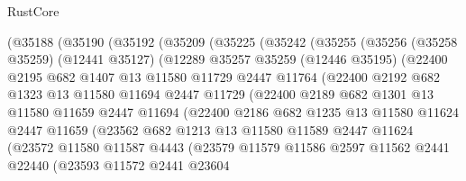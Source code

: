 \begin{lexlean}{RustCore}
\begin{coremodule}
      (@35188
        (@35190
          (@35192
            (@35209
              (@35225
                (@35242
                  (@35255
                    (@35256
                      (@35258 @35259)
                      (@12441 @35127)
                      (@12289
                        @35257
                        @35259
                        (@12446 @35195)
                        (@22400
                          @2195
                          @682
                          @1407
                          @13
                          @11580
                          @11729
                          @2447
                          @11764
                          (@22400
                            @2192
                            @682
                            @1323
                            @13
                            @11580
                            @11694
                            @2447
                            @11729
                            (@22400
                              @2189
                              @682
                              @1301
                              @13
                              @11580
                              @11659
                              @2447
                              @11694
                              (@22400
                                @2186
                                @682
                                @1235
                                @13
                                @11580
                                @11624
                                @2447
                                @11659
                                (@23562
                                  @682
                                  @1213
                                  @13
                                  @11580
                                  @11589
                                  @2447
                                  @11624
                                  (@23572
                                    @11580
                                    @11587
                                    @4443
                                    (@23579
                                      @11579
                                      @11586
                                      @2597
                                      @11562
                                      @2441
                                      @22440
                                      (@23593
                                        @11572
                                        @2441
                                        @23604

\end{coremodule}
\end{lexlean}

